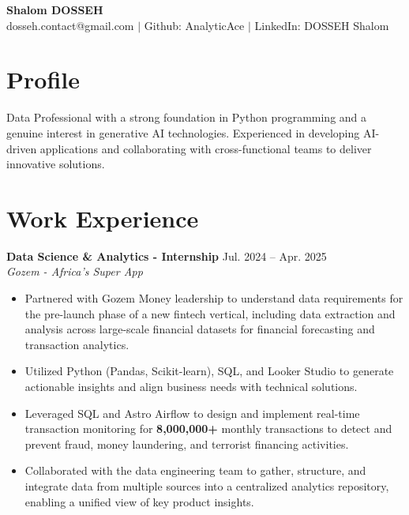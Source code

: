\documentclass[letterpaper,11pt]{article}
\begin{document}
\begin{center}
    {\huge\textbf{Shalom DOSSEH}} \\
    \vspace{2mm}
    dosseh.contact@gmail.com $|$
    Github: AnalyticAce $|$
    LinkedIn: DOSSEH Shalom
\end{center}


\section*{Profile}
Data Professional with a strong foundation in Python programming and a genuine interest in generative AI technologies. Experienced in developing AI-driven applications and collaborating with cross-functional teams to deliver innovative solutions.



\section*{Work Experience}

\textbf{Data Science \& Analytics - Internship} \hfill Jul. 2024 -- Apr. 2025 \\
\textit{Gozem - Africa's Super App} \\
\begin{itemize}
    
    \item Partnered with Gozem Money leadership to understand data requirements for the pre-launch phase of a new fintech vertical, including data extraction and analysis across large-scale financial datasets for financial forecasting and transaction analytics.
    
    \item Utilized Python (Pandas, Scikit-learn), SQL, and Looker Studio to generate actionable insights and align business needs with technical solutions.
    
    \item Leveraged SQL and Astro Airflow to design and implement real-time transaction monitoring for \textbf{8,000,000+} monthly transactions to detect and prevent fraud, money laundering, and terrorist financing activities.
    
    \item Collaborated with the data engineering team to gather, structure, and integrate data from multiple sources into a centralized analytics repository, enabling a unified view of key product insights.
    
\end{itemize}
\end{document}
